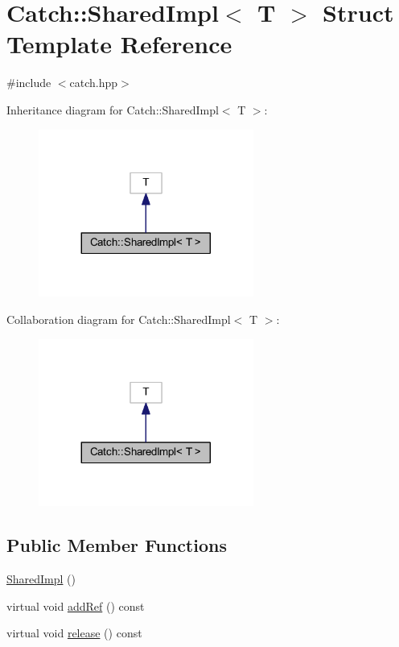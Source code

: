 \hypertarget{struct_catch_1_1_shared_impl}{}\section{Catch\+:\+:Shared\+Impl$<$ T $>$ Struct Template Reference}
\label{struct_catch_1_1_shared_impl}


{\ttfamily \#include $<$catch.\+hpp$>$}



Inheritance diagram for Catch\+:\+:Shared\+Impl$<$ T $>$\+:\nopagebreak
\begin{figure}[H]
\begin{center}
\leavevmode
\includegraphics[width=200pt]{struct_catch_1_1_shared_impl__inherit__graph}
\end{center}
\end{figure}


Collaboration diagram for Catch\+:\+:Shared\+Impl$<$ T $>$\+:\nopagebreak
\begin{figure}[H]
\begin{center}
\leavevmode
\includegraphics[width=200pt]{struct_catch_1_1_shared_impl__coll__graph}
\end{center}
\end{figure}
\subsection*{Public Member Functions}
\begin{DoxyCompactItemize}
\item 
\hyperlink{struct_catch_1_1_shared_impl_a0629856ee353298b61ad52cf60e716fb}{Shared\+Impl} ()
\item 
virtual void \hyperlink{struct_catch_1_1_shared_impl_a5d1a4c96e8fc07c821890fd09749062e}{add\+Ref} () const
\item 
virtual void \hyperlink{struct_catch_1_1_shared_impl_ada8052c6f24fd73ec099333626f106fe}{release} () const
\end{DoxyCompactItemize}
